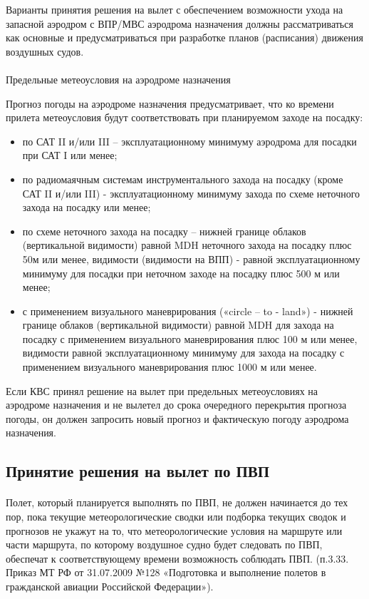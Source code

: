 Варианты принятия решения на вылет с обеспечением возможности ухода на запасной аэродром с ВПР/МВС аэродрома назначения должны рассматриваться как основные и предусматриваться при разработке планов (расписания) движения воздушных судов. 

\paragraph{}Предельные метеоусловия на аэродроме назначения

Прогноз погоды на аэродроме назначения предусматривает, что ко времени прилета метеоусловия будут соответствовать при планируемом заходе на посадку: 
\begin{itemize}
    \item по САТ II и/или III – эксплуатационному минимуму аэродрома для посадки при САТ I или менее;
    \item по радиомаячным системам инструментального захода на посадку (кроме САТ II и/или III) - эксплуатационному минимуму захода по схеме неточного захода на посадку или менее; 
    \item по схеме неточного захода на посадку – нижней границе облаков (вертикальной видимости) равной MDH неточного захода на посадку плюс 50м или менее, видимости (видимости на ВПП) - равной эксплуатационному минимуму для посадки при неточном заходе на посадку плюс 500 м или менее; 
    \item с применением визуального маневрирования («circle – to - land») - нижней границе облаков (вертикальной видимости) равной MDH для захода на посадку с применением визуального маневрирования плюс 100 м или менее, видимости равной эксплуатационному минимуму для захода на посадку с применением визуального маневрирования плюс 1000 м или менее. 
\end{itemize}

Если КВС принял решение на вылет при предельных метеоусловиях на аэродроме назначения и не вылетел до срока очередного перекрытия прогноза погоды, он должен запросить новый прогноз и фактическую погоду аэродрома назначения. 

\subsection{Принятие решения на вылет по ПВП}

\paragraph{} Полет, который планируется выполнять по ПВП, не должен начинается до тех пор, пока текущие метеорологические сводки или подборка текущих сводок и прогнозов не укажут на то, что метеорологические условия на маршруте или части маршрута, по которому воздушное судно будет следовать по ПВП, обеспечат к соответствующему времени возможность соблюдать ПВП. (п.3.33. Приказ МТ РФ от 31.07.2009 №128 «Подготовка и выполнение полетов в гражданской авиации Российской Федерации»).

